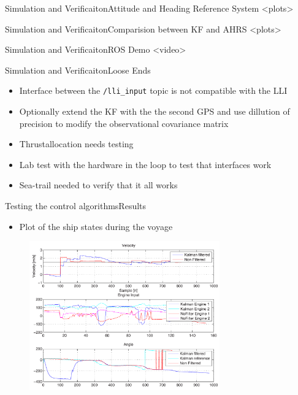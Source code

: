 \documentclass[10pt,handout]{beamer}
\begin{document}
\begin{frame}{Simulation and Verificaiton}{Attitude and Heading Reference System}
<plots>
\end{frame}

\begin{frame}{Simulation and Verificaiton}{Comparision between KF and AHRS}
<plots>
\end{frame}

\begin{frame}{Simulation and Verificaiton}{ROS Demo}
<video>
\end{frame}

\begin{frame}{Simulation and Verificaiton}{Loose Ends}
\begin{itemize}
  \item Interface between the \texttt{/lli\_input} topic is not compatible with the LLI
  \item Optionally extend the KF with the the second GPS and use dillution of precision to modify the observational covariance matrix
  \item Thrustallocation needs testing
  \item Lab test with the hardware in the loop to test that interfaces work
  \item Sea-trail needed to verify that it all works
\end{itemize}
\end{frame}


\begin{frame}{Testing the control algorithms}{Results}
  \begin{itemize}
  \item Plot of the ship states during the voyage
  \end{itemize}
  \begin{figure}
    \begin{center}
      \includegraphics[width=8.2cm]{img/states}
      \label{fig:controltest3}
    \end{center}
  \end{figure}
\end{frame}
\end{document}
